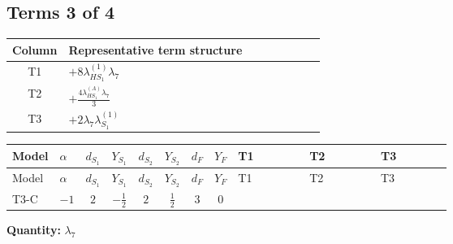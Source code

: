 \documentclass[8pt]{article}
\begin{document}
\begin{landscape}
\subsection*{Terms 3 of 4}
\begin{center}
\begin{tabular}{@{}c >{\raggedright\arraybackslash}p{0.82\linewidth}@{}}
\toprule
Column & Representative term structure \\
\midrule
T1 & \(\displaystyle +8 {\lambda_{HS_1}^{(1)}} {\lambda_{7}}\) \\
\midrule
T2 & \(\displaystyle +\frac{4 {\lambda_{HS_1}^{(A)}} {\lambda_{7}}}{3}\) \\
\midrule
T3 & \(\displaystyle +2 {\lambda_{7}} {\lambda_{S_1}^{(1)}}\) \\
\midrule
\bottomrule
\end{tabular}
\end{center}
\smallskip
\tiny
\begin{longtable}{@{}llcccccc >{\raggedright\arraybackslash}p{0.21\linewidth} >{\raggedright\arraybackslash}p{0.21\linewidth} >{\raggedright\arraybackslash}p{0.21\linewidth}@{}}
\toprule
Model & $\alpha$ & $d_{S_1}$ & $Y_{S_1}$ & $d_{S_2}$ & $Y_{S_2}$ & $d_F$ & $Y_F$ & T1 & T2 & T3 \\
\midrule
\endfirsthead
\toprule
Model & $\alpha$ & $d_{S_1}$ & $Y_{S_1}$ & $d_{S_2}$ & $Y_{S_2}$ & $d_F$ & $Y_F$ & T1 & T2 & T3 \\
\midrule
\endhead
T3-C & $-1$ & $2$ & $-\frac{1}{2}$ & $2$ & $\frac{1}{2}$ & $3$ & $0$ & \scriptsize\adjustbox{max width=\linewidth}{$\begin{gathered} +8 {\lambda_{HS_1}^{(1)}} {\lambda_{7}}\end{gathered}$} & \scriptsize\adjustbox{max width=\linewidth}{$\begin{gathered} +\frac{4 {\lambda_{HS_1}^{(A)}} {\lambda_{7}}}{3}\end{gathered}$} & \scriptsize\adjustbox{max width=\linewidth}{$\begin{gathered} +2 {\lambda_{7}} {\lambda_{S_1}^{(1)}}\end{gathered}$} \\
\midrule
\bottomrule
\end{longtable}
\clearpage
\noindent\textbf{Quantity: }$\lambda_{7}$\par\smallskip

\end{landscape}
\end{document}
